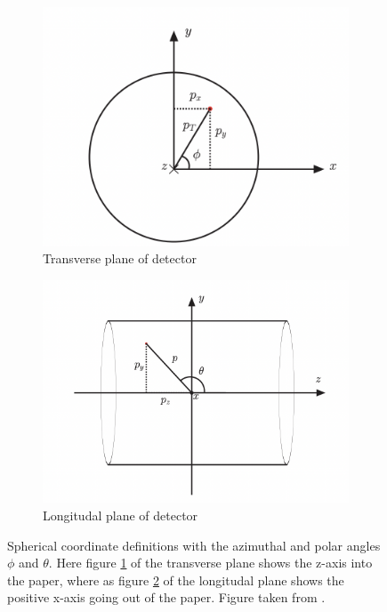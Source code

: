 \begin{figure}[h!]
    \centering
    \begin{subfigure}{.45\textwidth}
        \includegraphics[width=\textwidth]{Figures/atlas/transverse_plane.png}
        \caption{Transverse plane of detector}
        \label{fig:transverse_plane}
    \end{subfigure}
    \hfill
    \begin{subfigure}{.45\textwidth}
        \includegraphics[width=\textwidth]{Figures/atlas/longitudal_plane.png}
        \caption{Longitudal plane of detector}
        \label{fig:longitudal_plane}
    \end{subfigure}
    \hfill
    \caption[ATLAS detector longitudal and azimuthal diagrams]{Spherical coordinate definitions with the azimuthal and polar angles $\phi$ and $\theta$. Here figure \ref{fig:transverse_plane} of the transverse plane shows the z-axis
     into the paper, where as figure \ref{fig:longitudal_plane} of the longitudal plane shows the positive x-axis going out of the paper. Figure taken from \cite{Gramstad:1631043}.}
    \label{fig:long_trans_plane}
\end{figure}

